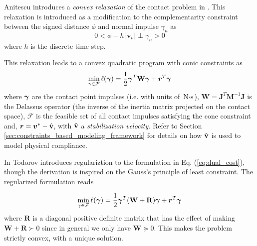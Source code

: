 Anitescu introduces a \textit{convex relaxation} of the contact problem in
\cite{bib:anitescu2006}. This relaxation is introduced as a modification to the
complementarity constraint between the signed distance $\phi$ and normal impulse
$\gamma_n$ as
\begin{equation}
	0 < \phi - h \Vert {\bm v}_t \Vert \perp \gamma_n > 0
	\label{eq:convex_relaxation_complementarity_condition}
\end{equation}
where $h$ is the discrete time step.


This relaxation leads to a convex quadratic program with conic constraints as
\begin{eqnarray}
	\min_{\gamma\in \mathcal{F}} \ell(\bgamma) =
	\frac{1}{2}\bgamma^T\mathbf{W}\bgamma + {\bm r}^T
	\bgamma
	\label{eq:dual_cost}
\end{eqnarray}
where ${\bm\gamma}$ are the contact point impulses (i.e. with units of
$\text{N}\cdot\text{s}$), $\mathbf{W} = \mathbf{J}^T\mathbf{M}^{-1}\mathbf{J}$
is the Delassus operator (the inverse of the inertia matrix projected on the
contact space), $\mathcal{F}$ is the feasible set of all contact impulses
satisfying the cone constraint and, ${\bm r} = {\bm v}^* - \hat{{\mathbf{v}}}$, with
$\hat{{\mathbf{v}}}$ a \textit{stabilization velocity}. Refer to Section
\ref{sec:constraints_based_modeling_framework} for details on how $\hat{{\mathbf{v}}}$
is used to model physical compliance.

In \cite{bib:todorov2011, bib:todorov2014} Todorov introduces regulariztion to
the formulation in Eq. (\ref{eq:dual_cost}), though the derivation is inspired
on the Gauss's principle of least constraint. The regularized formulation reads

\begin{eqnarray}
	\min_{\gamma\in \mathcal{F}} \ell(\bgamma) =
	\frac{1}{2}\bgamma^T(\mathbf{W}+\mathbf{R})\bgamma + {\bm r}^T
	\bgamma
	\label{eq:dual_regularized}
\end{eqnarray}
where $\mathbf{R}$ is a diagonal positive definite matrix that has the effect of
making $\mathbf{W}+\mathbf{R}\succ 0$ since in general we only have $\mathbf{W}
\succeq 0$. This makes the problem strictly convex, with a unique solution. 

